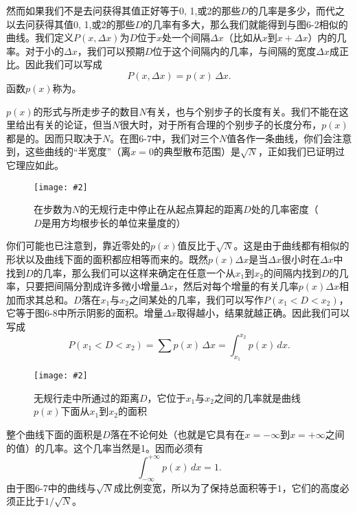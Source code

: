\documentclass[12pt,oneside]{book}
\newenvironment{fig}[2][1]
{\begin{figure}[H]
\centering
\texttt{[image: \#2]}}
{\end{figure}}
\newenvironment{linefig}[2][1]
{\begin{figure}[H]
\centering
\texttt{[image: \#2]}}
{\end{figure}}
\begin{document}
然而如果我们不是去问获得其值正好等于0, 1,或2的那些$D$的几率是多少，而代之以去问获得其值0, 1,或2的那些$D$的几率有多大，那么我们就能得到与图6-2相似的曲线。我们定义$P(x,\Delta x)$为$D$位于$x$处一个间隔$\Delta x$（比如从$x$到$x+\Delta x$）内的几率。对于小的$\Delta x$，我们可以预期$D$位于这个间隔内的几率，与间隔的宽度$\Delta x$成正比。因此我们可以写成
\begin{equation}
\label{Eq:I:6:17}
P(x,\Delta x)=p(x)\,\Delta x.
\end{equation}
函数$p(x)$称为。

$p(x)$的形式与所走步子的数目$N$有关，也与个别步子的长度有关。我们不能在这里给出有关的论证，但当$N$很大时，对于所有合理的个别步子的长度分布，$p(x)$都是的。因而只取决于$N$。在图6-7中，我们对三个$N$值各作一条曲线，你们会注意到，这些曲线的“半宽度”（离$x=0$的典型散布范围）是$\sqrt{N}$，正如我们已证明过它理应如此。
\begin{linefig}{在步数为N的无规行走中停止在从起点算起的距离}
\caption{\footnotesize 在步数为$N$的无规行走中停止在从起点算起的距离$D$处的几率密度（$D$是用方均根步长的单位来量度的）}
\label{fig:在步数为N的无规行走中停止在从起点算起的距离}
\end{linefig}

你们可能也已注意到，靠近零处的$p(x)$值反比于$\sqrt{N}$。这是由于曲线都有相似的形状以及曲线下面的面积都应相等而来的。既然$p(x)\Delta x$是当$\Delta x$很小时在$\Delta x$中找到$D$的几率，那么我们可以这样来确定在任意一个从$x_1$到$x_2$的间隔内找到$D$的几率，只要把间隔分割成许多微小增量$\Delta x$，然后对每个增量的有关几率$p(x)\Delta x$相加而求其总和。$D$落在$x_1$与$x_2$之间某处的几率，我们可以写作$P(x_1 < D < x_2)$，它等于图6-8中所示阴影的面积。增量$\Delta x$取得越小，结果就越正确。因此我们可以写成
\begin{equation}
\label{Eq:I:6:18}
P(x_1 < D < x_2)=\sum p(x)\,\Delta x=\int_{x_1}^{x_2}p(x)\,dx.
\end{equation}
\begin{fig}{无规行走中所通过的距离D，它位于x1与x2}
\caption{\footnotesize 无规行走中所通过的距离$D$，它位于$x_1$与$x_2$之间的几率就是曲线$p(x)$下面从$x_1$到$x_2$的面积}
\label{fig:无规行走中所通过的距离D，它位于x1与x2}
\end{fig}

整个曲线下面的面积是$D$落在不论何处（也就是它具有在$x=-\infty$到$x=+\infty$之间的值）的几率。这个几率当然是1。因而必须有
\begin{equation}
\label{Eq:I:6:19}
\int_{-\infty}^{+\infty}p(x)\,dx=1.
\end{equation}
由于图6-7中的曲线与$\sqrt{N}$成比例变宽，所以为了保持总面积等于$1$，它们的高度必须正比于$1/\sqrt{N}$。
\end{document}
